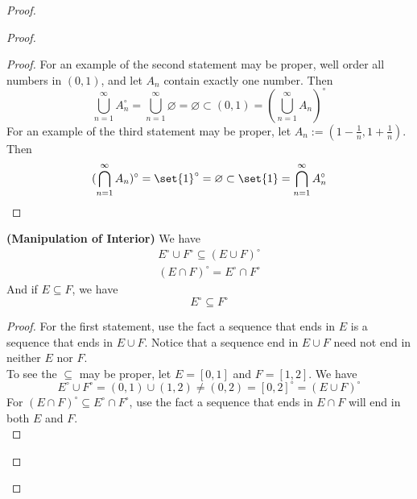 \documentclass{report}
\begin{document}
\begin{proof}
\begin{proof}
\begin{proof}
For an example of the second statement may be proper, well order all numbers in $(0,1)$, and let $A_n$ contain exactly one number. Then
\begin{equation*}
\bigcup_{n=1}^\infty A_n^\circ=\bigcup_{n=1}^\infty \varnothing=\varnothing \subset (0,1)=(\bigcup_{n=1}^\infty A_n)^\circ 
\end{equation*}
For an example of the third statement may be proper, let $A_n:=(1-\frac{1}{n},1+\frac{1}{n})$. Then
\begin{equation*}
  (\bigcap _{n=1}^\infty A_n)^\circ =\set{1}^\circ =\varnothing \subset \set{1}=\bigcap_{n=1}^\infty A_n^\circ 
\end{equation*}
\end{proof}
\begin{theorem}
\label{3.3.4}
\textbf{(Manipulation of Interior)} We have
\begin{gather*}
E^\circ \cup F^\circ\subseteq (E\cup F)^\circ\\
(E\cap F)^\circ = E^\circ \cap F^\circ 
\end{gather*}
And if $E\subseteq F$, we have
\begin{equation*}
E^\circ \subseteq F^\circ 
\end{equation*}
\end{theorem}
\begin{proof}
For the first statement, use the fact a sequence that ends in $E$ is a sequence that ends in $E\cup F$. Notice that a sequence end in $E\cup F$ need not end in neither $E$ nor  $F$.\\

To see the $\subseteq$ may be proper, let $E=[0,1]$ and $F=[1,2]$. We have
\begin{equation*}
E^\circ \cup F^\circ= (0,1)\cup (1,2)\neq (0,2)=[0,2]^\circ =(E\cup F)^\circ 
\end{equation*}
For $(E\cap F)^\circ \subseteq E^\circ \cap F^\circ $, use the fact a sequence that ends in $E\cap F$ will end in both $E$ and  $F$.\\


\end{proof}
\end{proof}
\end{proof}
\end{document}
